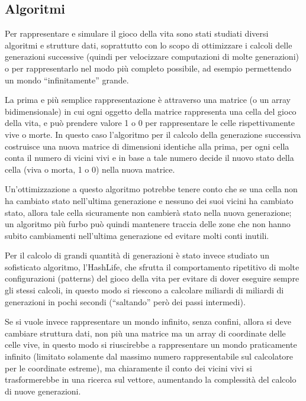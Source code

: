\subsection{Algoritmi}
\label{sec:algorithms}
Per rappresentare e simulare il gioco della vita sono stati studiati diversi algoritmi e strutture dati, soprattutto con lo scopo di ottimizzare i calcoli delle generazioni successive (quindi per velocizzare computazioni di molte generazioni) o per rappresentarlo nel modo pi\`u completo possibile, ad esempio permettendo un mondo ``infinitamente'' grande.

La prima e pi\`u semplice rappresentazione \`e attraverso una matrice (o un array bidimensionale) in cui ogni oggetto della matrice rappresenta una cella del gioco della vita, e pu\`o prendere valore 1 o 0 per rappresentare le celle rispettivamente vive o morte. In questo caso l'algoritmo per il calcolo della generazione successiva costruisce una nuova matrice di dimensioni identiche alla prima, per ogni cella conta il numero di vicini vivi e in base a tale numero decide il nuovo stato della cella (viva o morta, 1 o 0) nella nuova matrice.

Un'ottimizzazione a questo algoritmo potrebbe tenere conto che se una cella non ha cambiato stato nell'ultima generazione e nessuno dei suoi vicini ha cambiato stato, allora tale cella sicuramente non cambier\`a stato nella nuova generazione; un algoritmo pi\`u furbo pu\`o quindi mantenere traccia delle zone che non hanno subito cambiamenti nell'ultima generazione ed evitare molti conti inutili.

Per il calcolo di grandi quantit\`a di generazioni \`e stato invece studiato un sofisticato algoritmo, l'HashLife, che sfrutta il comportamento ripetitivo di molte configurazioni (patterns) del gioco della vita per evitare di dover eseguire sempre gli stessi calcoli, in questo modo si riescono a calcolare miliardi di miliardi di generazioni in pochi secondi (``saltando'' per\`o dei passi intermedi).

Se si vuole invece rappresentare un mondo infinito, senza confini, allora si deve cambiare struttura dati, non pi\`u una matrice ma un array di coordinate delle celle vive, in questo modo si riuscirebbe a rappresentare un mondo praticamente infinito (limitato solamente dal massimo numero rappresentabile sul calcolatore per le coordinate estreme), ma chiaramente il conto dei vicini vivi si trasformerebbe in una ricerca sul vettore, aumentando la complessit\`a del calcolo di nuove generazioni.

